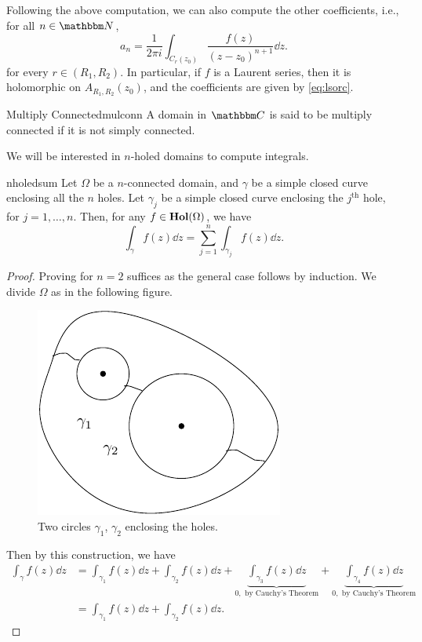 \documentclass[../ComplexAnalysis_Notes.tex]{subfiles}
\begin{document}
Following the above computation, we can also compute the other coefficients, i.e., for all \(n \in \N\),
\[
  a_n = \frac{1}{2 \pi i} \int_{C_r(z_0)} \frac{f(z)}{(z - z_0)^{n + 1}} \dd{z}.
\]
for every \(r \in (R_1, R_2)\). In particular, if \(f\) is a Laurent series, then it is holomorphic on \(A_{R_1, R_2}(z_0)\), and the coefficients are given by \eqref{eq:lsorc}.

\begin{Def}{Multiply Connected}{mulconn}
  A domain in \(\C\) is said to be multiply connected if it is not simply connected.
\end{Def}

We will be interested in \(n\)-holed domains to compute integrals.

\begin{Thm}{}{nholedsum}
  Let \(\Omega\) be a \(n\)-connected domain, and \(\gamma\) be a simple closed curve enclosing all the \(n\) holes. Let \(\gamma_j\) be a simple closed curve enclosing the \(j^{\text{th}}\) hole, for \(j = 1, \ldots, n\). Then, for any \(f \in \operatorname{\mathbf{Hol}}(\Omega)\), we have
  \[
    \int_{\gamma} f(z) \dd{z} = \sum_{j = 1}^{n} \int_{\gamma_j} f(z) \dd{z}.
  \]
\end{Thm}
\begin{proof}
  Proving for \(n = 2\) suffices as the general case follows by induction. We divide \(\Omega\) as in the following figure.
  
  \begin{figure}[H]
    \centering
    \includegraphics[scale=1]{../figures/two_circle}
    \caption{Two circles \(\gamma_1\), \(\gamma_2\) enclosing the holes.}
    \label{fig:two_circle}
  \end{figure}
  
  Then by this construction, we have
  \begin{align*}
    \int_{\gamma} f(z) \dd{z}
     & = \int_{\gamma_1} f(z) \dd{z} + \int_{\gamma_2} f(z) \dd{z} + \underbrace{\int_{\gamma_3} f(z) \dd{z}}_{0, \text{ by Cauchy's Theorem}} + \underbrace{\int_{\gamma_4} f(z) \dd{z}}_{0, \text{ by Cauchy's Theorem}} \\
     & = \int_{\gamma_1} f(z) \dd{z} + \int_{\gamma_2} f(z) \dd{z}.
  \end{align*}
\end{proof}
\end{document}
